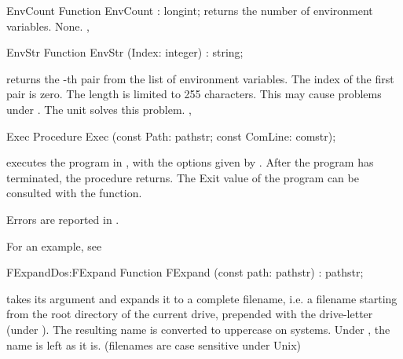 \begin{function}{EnvCount}
\Declaration
Function EnvCount  : longint;\Description
{} returns the number of environment variables.
\Errors
None.
\SeeAlso
{}, 
\end{function}

\begin{function}{EnvStr}
\Declaration
Function EnvStr (Index: integer) : string;\Description

 returns the -th  pair from the list
of environment variables. 
The index of the first pair is zero.
\Errors
The length is limited to 255 characters. This may cause problems under
\linux. The \linux unit solves this problem.
\SeeAlso
{}, 
\end{function}


\begin{procedure}{Exec}
\Declaration
Procedure Exec (const Path: pathstr; const ComLine: comstr);
\Description

 executes the program in , with the options given by
.
After the program has terminated, the procedure returns. The Exit value of
the program can be consulted with the  function.

\Errors
Errors are reported in .
\SeeAlso
{}
\end{procedure}
For an example, see 
\begin{functionl}{FExpand}{Dos:FExpand}
\Declaration
Function FExpand (const path: pathstr) : pathstr;
\Description

 takes its argument and expands it to a complete filename, i.e.
a filename starting from the root directory of the current drive, prepended
with the drive-letter (under \dos).
The resulting name is converted to uppercase on \dos systems. Under \linux,
the name is left as it is. (filenames are case sensitive under Unix)

\Errors
{}
\SeeAlso

\end{functionl}

